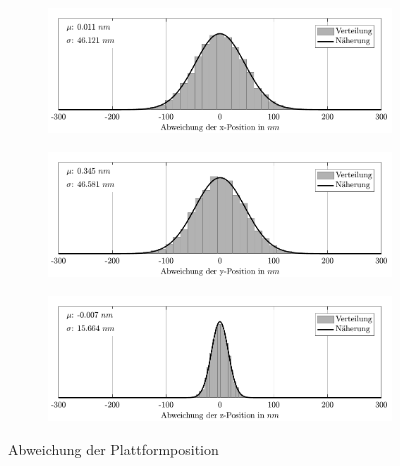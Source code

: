 \newpage
\blindtext[1]
\begin{figure}[H]
    \centering
    \begin{subfigure}[b]{\textwidth}
    \includegraphics{graphics/results/drift/fig_drift_axis_tx.pdf}
    \end{subfigure}
    \begin{subfigure}[b]{\textwidth}
    \includegraphics{graphics/results/drift/fig_drift_axis_ty.pdf}
    \end{subfigure}
    \begin{subfigure}[b]{\textwidth}
    \includegraphics{graphics/results/drift/fig_drift_axis_tz.pdf}
    \end{subfigure}
    \caption[Abweichung der Plattformposition]{Abweichung der Plattformposition}\label{fig:results_drift_t}
\end{figure}
\blindtext[1]
